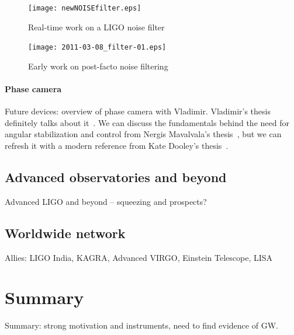 	\begin{figure}
	\begin{center}
	\texttt{[image: newNOISEfilter.eps]}
	\caption{Real-time work on a LIGO noise filter}
	\label{newNOISEfilter}
	\end{center}
	\end{figure}

	\begin{figure}
	\begin{center}
	\texttt{[image: 2011-03-08\_filter-01.eps]}
	\caption{Early work on post-facto noise filtering}
	\label{filter_early}
	\end{center}
	\end{figure}

                \paragraph{Phase camera}
                \label{phase_camera}

                    Future devices: overview of phase camera with Vladimir. Vladimir's thesis definitely talks about it~\cite{DergachevThesis}. We can discuss the fundamentals behind the need for angular stabilization and control from Nergis Mavalvala's thesis~\cite{MavalvalaThesis}, but we can refresh it with a modern reference from Kate Dooley's thesis~\cite{DooleyThesis}.


        \subsection{Advanced observatories and beyond}
        \label{advanced}
  
            Advanced LIGO and beyond -- squeezing and prospects?

        \subsection{Worldwide network}
        \label{worldwide}
 
            Allies: LIGO India, KAGRA, Advanced VIRGO, Einstein Telescope, LISA

    \section{Summary}
    \label{intro_summary}
 
        Summary: strong motivation and instruments, need to find evidence of GW.    
            
